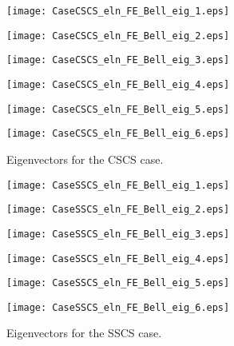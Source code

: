 \documentclass[preprint,12pt]{elsarticle}
\begin{document}
 
\begin{figure}[p]%
	\texttt{[image: CaseCSCS\_eln\_FE\_Bell\_eig\_1.eps]}
	\caption*{$\widehat{\omega}_{1}$}\label{fig:CSCS1}%
	\endminipage
	\texttt{[image: CaseCSCS\_eln\_FE\_Bell\_eig\_2.eps]}
	\caption*{$\widehat{\omega}_{2}$}\label{fig:CSCS2}%
	\endminipage
	\texttt{[image: CaseCSCS\_eln\_FE\_Bell\_eig\_3.eps]}
	\caption*{$\widehat{\omega}_{3}$}\label{fig:CSCS3}%
	\endminipage
	\texttt{[image: CaseCSCS\_eln\_FE\_Bell\_eig\_4.eps]}
	\caption*{$\widehat{\omega}_{4}$}\label{fig:CSCS4}%
	\endminipage
	\texttt{[image: CaseCSCS\_eln\_FE\_Bell\_eig\_5.eps]}
	\caption*{$\widehat{\omega}_{5}$}\label{fig:CSCS5}%
	\endminipage
	\texttt{[image: CaseCSCS\_eln\_FE\_Bell\_eig\_6.eps]}
	\caption*{$\widehat{\omega}_{6}$}\label{fig:CSCS6}%
	\endminipage
	\caption[Eigenvectors for CSCS]{Eigenvectors for the CSCS case.}%
	\label{fig:CSCS}%
\end{figure}
\begin{figure}[p]%
	\texttt{[image: CaseSSCS\_eln\_FE\_Bell\_eig\_1.eps]}
	\caption*{$\widehat{\omega}_{1}$}\label{fig:SSCS1}%
	\endminipage
	\texttt{[image: CaseSSCS\_eln\_FE\_Bell\_eig\_2.eps]}
	\caption*{$\widehat{\omega}_{2}$}\label{fig:SSCS2}%
	\endminipage
	\texttt{[image: CaseSSCS\_eln\_FE\_Bell\_eig\_3.eps]}
	\caption*{$\widehat{\omega}_{3}$}\label{fig:SSCS3}%
	\endminipage
	\texttt{[image: CaseSSCS\_eln\_FE\_Bell\_eig\_4.eps]}
	\caption*{$\widehat{\omega}_{4}$}\label{fig:SSCS4}%
	\endminipage
	\texttt{[image: CaseSSCS\_eln\_FE\_Bell\_eig\_5.eps]}
	\caption*{$\widehat{\omega}_{5}$}\label{fig:SSCS5}%
	\endminipage
	\texttt{[image: CaseSSCS\_eln\_FE\_Bell\_eig\_6.eps]}
	\caption*{$\widehat{\omega}_{6}$}\label{fig:SSCS6}%
	\endminipage
	\caption[Eigenvectors for SSCS]{Eigenvectors for the SSCS case.}%
	\label{fig:SSCS}%
\end{figure}
\end{document}
